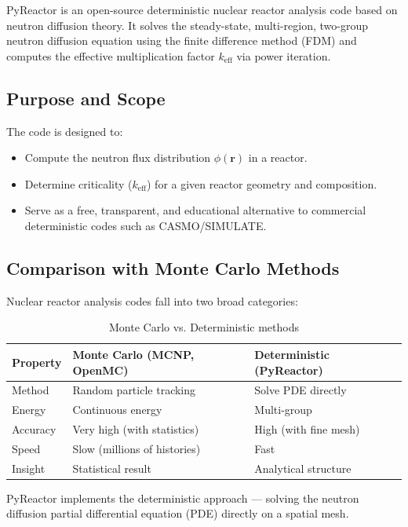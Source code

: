 \documentclass[12pt,a4paper]{article}
\newcommand{\keff}{k_{\mathrm{eff}}}
\begin{document}
PyReactor is an open-source deterministic nuclear reactor analysis code
based on neutron diffusion theory. It solves the steady-state, multi-region,
two-group neutron diffusion equation using the finite difference method (FDM)
and computes the effective multiplication factor $\keff$ via power iteration.

\subsection{Purpose and Scope}

The code is designed to:
\begin{itemize}
  \item Compute the neutron flux distribution $\phi(\mathbf{r})$ in a reactor.
  \item Determine criticality ($\keff$) for a given reactor geometry and composition.
  \item Serve as a free, transparent, and educational alternative to
        commercial deterministic codes such as CASMO/SIMULATE.
\end{itemize}

\subsection{Comparison with Monte Carlo Methods}

Nuclear reactor analysis codes fall into two broad categories:

\begin{table}[h!]
\centering
\begin{tabular}{lll}
\toprule
\textbf{Property} & \textbf{Monte Carlo (MCNP, OpenMC)} & \textbf{Deterministic (PyReactor)} \\
\midrule
Method       & Random particle tracking      & Solve PDE directly      \\
Energy       & Continuous energy             & Multi-group             \\
Accuracy     & Very high (with statistics)   & High (with fine mesh)   \\
Speed        & Slow (millions of histories)  & Fast                    \\
Insight      & Statistical result            & Analytical structure    \\
\bottomrule
\end{tabular}
\caption{Monte Carlo vs. Deterministic methods}
\end{table}

PyReactor implements the deterministic approach — solving the neutron
diffusion partial differential equation (PDE) directly on a spatial mesh.
\end{document}
